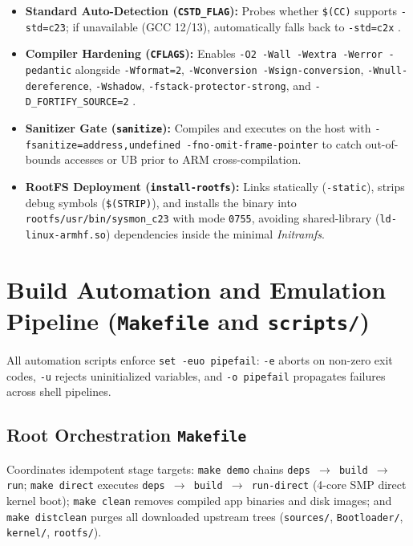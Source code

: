 \documentclass[11pt,a4paper]{article}
\begin{document}
\begin{itemize}
\item \textbf{Standard Auto-Detection (\texttt{CSTD\_FLAG}):} Probes whether \texttt{\$(CC)} supports \texttt{-std=c23}; if unavailable (GCC 12/13), automatically falls back to \texttt{-std=c2x} \cite{gcc_dialect}.
\item \textbf{Compiler Hardening (\texttt{CFLAGS}):} Enables \texttt{-O2 -Wall -Wextra -Werror -pedantic} alongside \texttt{-Wformat=2}, \texttt{-Wconversion -Wsign-conversion}, \texttt{-Wnull-dereference}, \texttt{-Wshadow}, \texttt{-fstack-protector-strong}, and \texttt{-D\_FORTIFY\_SOURCE=2} \cite{seacord2020}.
\item \textbf{Sanitizer Gate (\texttt{sanitize}):} Compiles and executes on the host with \texttt{-fsanitize=address,undefined -fno-omit-frame-pointer} to catch out-of-bounds accesses or UB prior to ARM cross-compilation.
\item \textbf{RootFS Deployment (\texttt{install-rootfs}):} Links statically (\texttt{-static}), strips debug symbols (\texttt{\$(STRIP)}), and installs the binary into \texttt{rootfs/usr/bin/sysmon\_c23} with mode \texttt{0755}, avoiding shared-library (\texttt{ld-linux-armhf.so}) dependencies inside the minimal \emph{Initramfs}.
\end{itemize}

\section{Build Automation and Emulation Pipeline (\texttt{Makefile} and \texttt{scripts/})}

All automation scripts enforce \texttt{set -euo pipefail}: \texttt{-e} aborts on non-zero exit codes, \texttt{-u} rejects uninitialized variables, and \texttt{-o pipefail} propagates failures across shell pipelines.

\subsection{Root Orchestration \texttt{Makefile}}
Coordinates idempotent stage targets: \texttt{make demo} chains \texttt{deps $\rightarrow$ build $\rightarrow$ run}; \texttt{make direct} executes \texttt{deps $\rightarrow$ build $\rightarrow$ run-direct} (4-core SMP direct kernel boot); \texttt{make clean} removes compiled app binaries and disk images; and \texttt{make distclean} purges all downloaded upstream trees (\texttt{sources/}, \texttt{Bootloader/}, \texttt{kernel/}, \texttt{rootfs/}).
\end{document}
